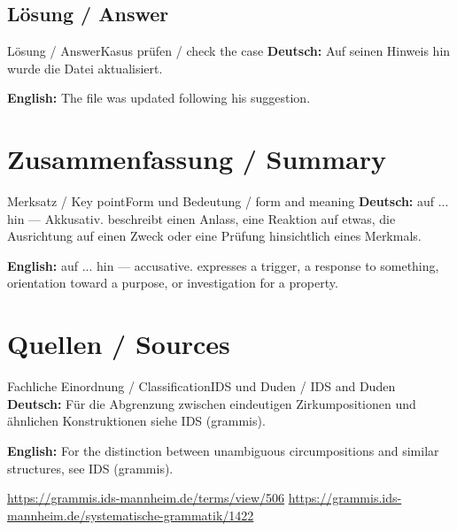 \documentclass[a4paper,11pt]{article}
\newcommand{\GermanText}[1]{\textbf{Deutsch: }#1\par}
\newcommand{\EnglishText}[1]{{\small\color{SoftGray}\textbf{English: }#1\par}}
\begin{document}
\subsection{Lösung / Answer}
\begin{grammarentry}{Lösung / Answer}{Kasus prüfen / check the case}
\GermanText{Auf seinen Hinweis hin wurde die Datei aktualisiert.}
\EnglishText{The file was updated following his suggestion.}
\end{grammarentry}
\section{Zusammenfassung / Summary}
\begin{grammarentry}{Merksatz / Key point}{Form und Bedeutung / form and meaning}
\GermanText{auf ... hin — Akkusativ. beschreibt einen Anlass, eine Reaktion auf etwas, die Ausrichtung auf einen Zweck oder eine Prüfung hinsichtlich eines Merkmals.}
\EnglishText{auf ... hin — accusative. expresses a trigger, a response to something, orientation toward a purpose, or investigation for a property.}
\end{grammarentry}
\section{Quellen / Sources}
\begin{grammarentry}{Fachliche Einordnung / Classification}{IDS und Duden / IDS and Duden}
\GermanText{Für die Abgrenzung zwischen eindeutigen Zirkumpositionen und ähnlichen Konstruktionen siehe IDS (grammis).}
\EnglishText{For the distinction between unambiguous circumpositions and similar structures, see IDS (grammis).}
\url{https://grammis.ids-mannheim.de/terms/view/506}
\url{https://grammis.ids-mannheim.de/systematische-grammatik/1422}
\end{grammarentry}
\end{document}

